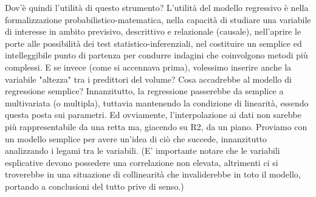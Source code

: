\documentclass{book}
\begin{document}
Dov'è quindi l'utilità di questo strumento? L'utilità del modello regressivo è nella formalizzazione probabilistico-matematica, nella capacità di studiare una variabile di interesse in ambito previsivo, descrittivo e relazionale (causale), nell'aprire le porte alle possibilità dei test statistico-inferenziali, nel costituire un semplice ed intelleggibile punto di partenza per condurre indagini che coinvolgono metodi più complessi.
E se invece (come si accennava prima), volessimo inserire anche la variabile "altezza" tra i predittori del volume? Cosa accadrebbe al modello di regressione semplice?
Innanzitutto, la regressione passerebbe da semplice a multivariata (o multipla), tuttavia mantenendo la condizione di linearità, essendo questa posta sui parametri. Ed ovviamente, l'interpolazione ai dati non sarebbe più rappresentabile da una retta ma, giacendo su R2, da un piano.
Proviamo con un modello semplice per avere un'idea di ciò che succede, innanzitutto analizzando i legami tra le variabili. (E' importante notare che le variabili esplicative devono possedere una correlazione non elevata, altrimenti ci si troverebbe in una situazione di collinearità che invaliderebbe in toto il modello, portando a conclusioni del tutto prive di senso.)
\end{document}
